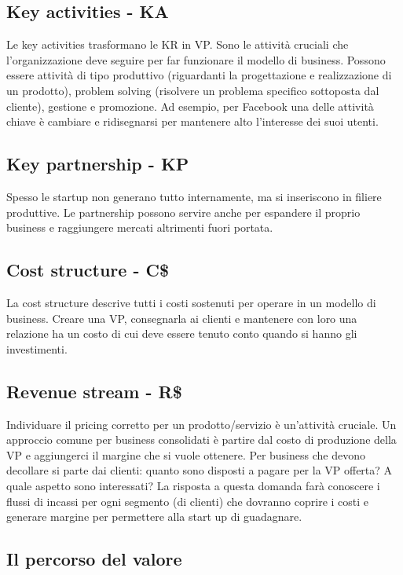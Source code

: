 \subsection{Key activities - KA}

Le key activities trasformano le KR in VP. Sono le attività cruciali che
l'organizzazione deve seguire per far funzionare il modello di business.
Possono essere attività di tipo produttivo (riguardanti la progettazione e
realizzazione di un prodotto), problem solving (risolvere un problema specifico
sottoposta dal cliente), gestione e promozione. Ad esempio, per Facebook una
delle attività chiave è cambiare e ridisegnarsi per mantenere alto l'interesse
dei suoi utenti.

\subsection{Key partnership - KP}

Spesso le startup non generano tutto internamente, ma si inseriscono in filiere
produttive. Le partnership possono servire anche per espandere il proprio
business e raggiungere mercati altrimenti fuori portata.

\subsection{Cost structure - C\$}

La cost structure descrive tutti i costi sostenuti per operare in un modello di
business. Creare una VP, consegnarla ai clienti e mantenere con loro una
relazione ha un costo di cui deve essere tenuto conto quando si hanno gli
investimenti.

\subsection{Revenue stream - R\$}

Individuare il pricing corretto per un prodotto/servizio è un'attività
cruciale. Un approccio comune per business consolidati è partire dal costo di
produzione della VP e aggiungerci il margine che si vuole ottenere.
Per business che devono decollare si parte dai clienti: quanto sono disposti a
pagare per la VP offerta? A quale aspetto sono interessati? La risposta
a questa domanda farà conoscere i flussi di incassi per ogni segmento
(di clienti) che dovranno coprire i costi e generare margine per permettere
alla start up di guadagnare.

\subsection{Il percorso del valore}

